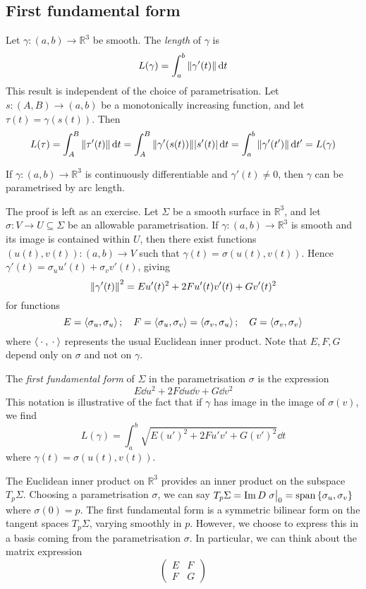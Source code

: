 \subsection{First fundamental form}
Let \( \gamma \colon (a,b) \to \mathbb R^3 \) be smooth.
The \textit{length} of \( \gamma \) is
\[ L(\gamma) = \int_a^b \norm{\gamma'(t)} \dd{t} \]
This result is independent of the choice of parametrisation.
Let \( s \colon (A,B) \to (a,b) \) be a monotonically increasing function, and let \( \tau(t) = \gamma(s(t)) \).
Then
\[ L(\tau) = \int_A^B \norm{\tau'(t)} \dd{t} = \int_A^B \norm{\gamma'(s(t))} \abs{s'(t)} \dd{t} = \int_a^b \norm{\gamma'(t')} \dd{t'} = L(\gamma) \]
\begin{lemma}
	If \( \gamma \colon (a,b) \to \mathbb R^3 \) is continuously differentiable and \( \gamma'(t) \neq 0 \), then \( \gamma \) can be parametrised by arc length.
\end{lemma}
The proof is left as an exercise.
Let \( \Sigma \) be a smooth surface in \( \mathbb R^3 \), and let \( \sigma \colon V \to U \subseteq \Sigma \) be an allowable parametrisation.
If \( \gamma \colon (a,b) \to \mathbb R^3 \) is smooth and its image is contained within \( U \), then there exist functions \( (u(t), v(t)) \colon (a,b) \to V \) such that \( \gamma(t) = \sigma(u(t), v(t)) \).
Hence \( \gamma'(t) = \sigma_u u'(t) + \sigma_v v'(t) \), giving
\[ \norm{\gamma'(t)}^2 = E u'(t)^2 + 2F u'(t) v'(t) + G v'(t)^2 \]
for functions
\[ E = \left\langle{\sigma_u, \sigma_u}\right\rangle;\quad F = \left\langle{\sigma_u, \sigma_v}\right\rangle = \left\langle{\sigma_v, \sigma_u}\right\rangle;\quad G = \left\langle{\sigma_v, \sigma_v}\right\rangle \]
where \( \left\langle{{}\cdot{},{}\cdot{}}\right\rangle \) represents the usual Euclidean inner product.
Note that \( E, F, G \) depend only on \( \sigma \) and not on \( \gamma \).
\begin{definition}
	The \textit{first fundamental form} of \( \Sigma \) in the parametrisation \( \sigma \) is the expression
	\[ E \dd{u}^2 + 2F \dd{u} \dd{v} + G \dd{v}^2 \]
	This notation is illustrative of the fact that if \( \gamma \) has image in the image of \( \sigma(v) \), we find
	\[ L(\gamma) = \int_a^b \sqrt{E (u')^2 + 2F u'v' + G (v')^2} \dd{t} \]
	where \( \gamma(t) = \sigma(u(t),v(t)) \).
\end{definition}
\begin{remark}
	The Euclidean inner product on \( \mathbb R^3 \) provides an inner product on the subspace \( T_p \Sigma \).
	Choosing a parametrisation \( \sigma \), we can say \( T_p \Sigma = \Im D \eval{\sigma}_0 = \vecspan{\qty{\sigma_u, \sigma_v}} \) where \( \sigma(0) = p \).
	The first fundamental form is a symmetric bilinear form on the tangent spaces \( T_p \Sigma \), varying smoothly in \( p \).
	However, we choose to express this in a basis coming from the parametrisation \( \sigma \).
	In particular, we can think about the matrix expression
	\[ \begin{pmatrix}
		E & F \\
		F & G
	\end{pmatrix} \]
\end{remark}

